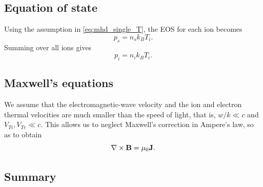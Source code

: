 \documentclass[a4paper,11pt]{report}
\begin{document}
\subsection{Equation of state}
Using the assumption in \cref{eq:mhd_single_T}, the EOS for each ion becomes
\begin{equation*}
    p_s = n_s k_B T_i.
\end{equation*}
Summing over all ions gives
\begin{equation*}
    p_i = n_i k_B T_i.
\end{equation*}


\subsection{Maxwell's equations}

We assume that the electromagnetic-wave velocity and the ion and electron thermal velocities are much smaller than the speed of light, that is, $w/k \ll c$ and $V_{Ti}, V_{Te} \ll c$. This allows us to neglect Maxwell's correction in Ampere's law, so as to obtain
\begin{equation}
    \nabla \times \mathbf{B} = \mu_0 \mathbf{J}.
\end{equation}

\subsection{Summary}
\end{document}
